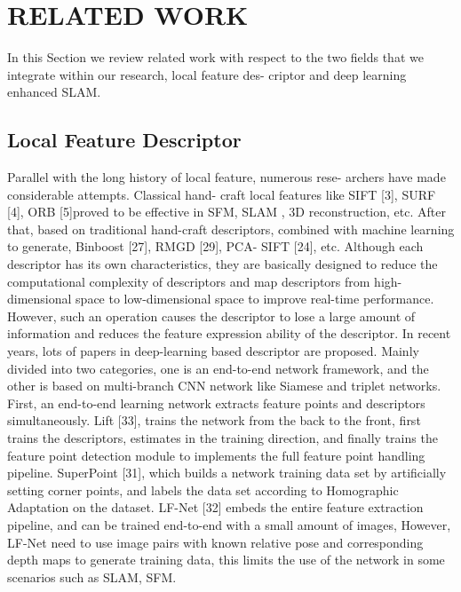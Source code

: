 \documentclass[letterpaper, 10 pt, conference]{ieeeconf}  %
\begin{document}
\section{RELATED WORK}
In this Section we review related work with respect to the two fields that we integrate within our research, local feature des- criptor and deep learning enhanced SLAM.
\subsection{Local Feature Descriptor}
Parallel with the long history of local feature, numerous rese- archers have made considerable attempts. Classical hand- craft local features like SIFT [3], SURF [4], ORB [5]proved to be effective in SFM, SLAM , 3D reconstruction, etc. After that, based on traditional hand-craft descriptors, combined with machine learning to generate, Binboost [27], RMGD [29], PCA- SIFT [24], etc. Although each descriptor has its own characteristics, they are basically designed to reduce the computational complexity of descriptors and map descriptors from high-dimensional space to low-dimensional space to improve real-time performance. However, such an operation causes the descriptor to lose a large amount of information and reduces the feature expression ability of the descriptor.
In recent years, lots of papers in deep-learning based descriptor are proposed. Mainly divided into two categories, one is an end-to-end network framework, and the other is based on multi-branch CNN network like Siamese and triplet networks.
First, an end-to-end learning network extracts feature points and descriptors simultaneously. Lift [33], trains the network from the back to the front, first trains the descriptors, estimates in the training direction, and finally trains the feature point detection module to implements the full feature point handling pipeline. SuperPoint [31], which builds a network training data set by artificially setting corner points, and labels the data set according to Homographic Adaptation on the dataset. LF-Net [32] embeds the entire feature extraction pipeline, and can be trained end-to-end with a small amount of images, However, LF-Net need to use image pairs with known relative pose and corresponding depth maps to generate training data, this limits the use of the network in some scenarios such as SLAM, SFM.
\end{document}
